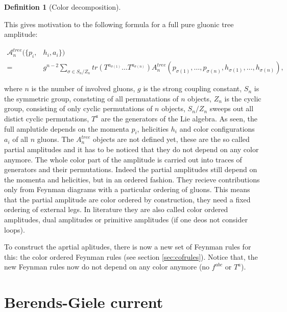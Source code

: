 \documentclass{article}
\theoremstyle{definition}
\newtheorem{definition}{Definition}[section]
\numberwithin{equation}{section}
\begin{document}
\begin{definition}[Color decomposition]
\label{def:decomp}

This gives motivation to the following formula for a full pure gluonic tree amplitude:

\begin{equation}
    \begin{aligned}
        \mathcal{A}_n^{tree}(\{p_i, &h_i, a_i\}) \\
        = &g^{n-2} \sum_{\sigma \in S_n/Z_n} tr (T^{a_{\sigma(1)}} \dots T^{a_{\sigma(n)}}) A_n^{tree}(p_{\sigma(1)}, \dots, p_{\sigma(n)}, h_{\sigma(1)}, \dots, h_{\sigma(n)}), \label{eq:decomp}
    \end{aligned}
\end{equation}

where $n$ is the number of involved gluons, $g$ is the strong coupling constant, $S_n$ is the symmetric group, conststing of all permuatations of $n$ objects, $Z_n$ is the cyclic group, consisting of only cyclic permutations of $n$ objects, $S_n/Z_n$ sweeps out all distict cyclic permutations, $T^a$ are the generators of the Lie algebra. As seen, the full amplutide depends on the momenta $p_i$, helicities $h_i$ and color configurations $a_i$ of all $n$ gluons. The $A_n^{tree}$ objects are not defined yet, these are the so called partial amplitudes and it has to be noticed that they do not depend on any color anymore. The whole color part of the amplitude is carried out into traces of generators and their permutations. Indeed the partial amplitudes still depend on the momenta and helicities, but in an ordered fashion. They recieve contributions only from Feynman diagrams with a particular ordering of gluons. This means that the partial amplitude are color ordered by construction, they need a fixed ordering of external legs. In literature they are also called color ordered amplitudes, dual amplitudes or primitive amplitudes (if one deos not consider loops).

To construct the aprtial aplitudes, there is now a new set of Feynman rules for this: the color ordered Feynman rules (see section \ref{sec:cofrules}). Notice that, the new Feynman rules now do not depend on any color anymore (no $f^{abc}$ or $T^a$).

\end{definition}

\section{Berends-Giele current}
\end{document}
